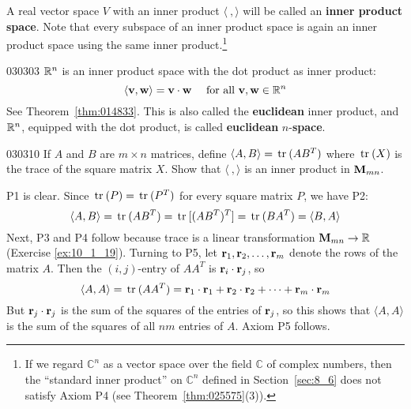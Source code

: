 \noindent A real vector space $V$ with an inner product $\langle\ , \rangle$ will be called an \textbf{inner product space}.  Note that every subspace of an inner product space is again an inner product space using the same inner product.\footnote{If we regard $\mathbb{C}^n$ as a vector space over the field $\mathbb{C}$  of complex numbers, then the ``standard inner product'' on $\mathbb{C}^n$ defined in Section~\ref{sec:8_6} does not satisfy Axiom P4 (see Theorem~\ref{thm:025575}(3)).}

\begin{example}{}{030303}
$\mathbb{R}^n$ is an inner product space with the dot product as inner product:
\begin{equation*}
\langle \textbf{v}, \textbf{w} \rangle = \textbf{v} \cdot \textbf{w} \quad \mbox{ for all } \textbf{v},  \textbf{w} \in \mathbb{R}^n
\end{equation*}
See Theorem~\ref{thm:014833}. This is also called the
\textbf{euclidean} inner product, and
$\mathbb{R}^n$, equipped with the dot product, is called \textbf{euclidean}
$n$-\textbf{space}. 
\end{example}

\begin{example}{}{030310}
If $A$ and $B$ are $m \times n$ matrices, define $\langle A, B\rangle = \thinspace\operatorname{tr\medspace}(AB^{T})$ where $\thinspace\operatorname{tr\medspace}(X)$ is the trace of the square matrix $X$. Show that $\langle\ , \rangle$ is an inner product in $\textbf{M}_{mn}$.

\begin{solution}
P1 is clear. Since $\thinspace\operatorname{tr\medspace}(P) = \thinspace\operatorname{tr\medspace}(P^{T})$ for every square matrix $P$, we have P2:
\begin{equation*}
\langle A, B \rangle = \thinspace\operatorname{tr\medspace}(AB^T) = \thinspace\operatorname{tr\medspace}[(AB^T)^T] = \thinspace\operatorname{tr\medspace}(BA^T) = \langle B, A \rangle 
\end{equation*}
Next, P3 and P4 follow because trace is a linear transformation $\textbf{M}_{mn} \to \mathbb{R}$ (Exercise \ref{ex:10_1_19}). Turning to P5, let $\textbf{r}_{1}, \textbf{r}_{2}, \dots, \textbf{r}_{m}$ denote the rows of the matrix $A$. Then the $(i, j)$-entry of $AA^{T}$ is $\textbf{r}_{i} \cdot \textbf{r}_{j}$, so
\begin{equation*}
\langle A, A \rangle = \thinspace\operatorname{tr\medspace}(AA^T) = 
\textbf{r}_1 \cdot \textbf{r}_1 + 
\textbf{r}_2 \cdot \textbf{r}_2 + \dots +
\textbf{r}_m \cdot \textbf{r}_m
\end{equation*}
But $\textbf{r}_{j} \cdot \textbf{r}_{j}$ is the sum of the squares of
the entries of $\textbf{r}_{j}$, so this shows that $\langle A, A\rangle$ is the sum of the squares of all $nm$ entries of $A$. Axiom P5 follows.
\end{solution}
\end{example}

